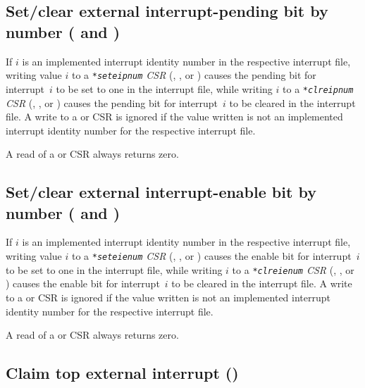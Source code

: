 \subsection{%
Set/clear external interrupt-pending bit by number
( and )%
}

If $i$ is an implemented interrupt identity number in the respective
interrupt file, writing value $i$ to a \emph{\texttt{*seteipnum} CSR}
(, , or ) causes the pending
bit for interrupt~$i$ to be set to one in the interrupt file, while
writing $i$ to a \emph{\texttt{*clreipnum} CSR} (,
, or ) causes the pending bit for
interrupt~$i$ to be cleared in the interrupt file.
A write to a  or  CSR is ignored if the
value written is not an implemented interrupt identity number for the
respective interrupt file.

A read of a  or  CSR always returns zero.

\subsection{%
Set/clear external interrupt-enable bit by number
( and )%
}

If $i$ is an implemented interrupt identity number in the respective
interrupt file, writing value $i$ to a \emph{\texttt{*seteienum} CSR}
(, , or ) causes the enable
bit for interrupt~$i$ to be set to one in the interrupt file, while
writing $i$ to a \emph{\texttt{*clreienum} CSR} (,
, or ) causes the enable bit for
interrupt~$i$ to be cleared in the interrupt file.
A write to a  or  CSR is ignored if the
value written is not an implemented interrupt identity number for the
respective interrupt file.

A read of a  or  CSR always returns zero.

\subsection{Claim top external interrupt ()}

